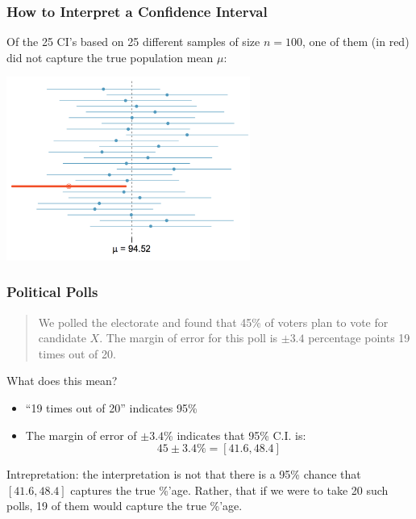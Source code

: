\documentclass[slides]{beamer}
\newcommand{\blue}[1]{\textcolor{blue2}{#1}}
\begin{document}
\begin{frame}
\frametitle{How to Interpret a Confidence Interval}
Of the 25 CI's based on 25 different samples of size $n=100$, one of them (in red) did not capture the true population mean $\mu$:

\begin{center}
\includegraphics[width=8cm]{figure/CI.png}
\end{center}

\end{frame}


\begin{frame}
\frametitle{Political Polls}
\begin{quotation}
\noindent We polled the electorate and found that 45\% of voters plan to vote for candidate $X$.  The margin of error for this poll is $\pm 3.4$ percentage points 19 times out of 20.  
\end{quotation}
\pause What does this mean?
\begin{itemize}
\item ``19 times out of 20'' indicates 95\%
\item The margin of error of $\pm 3.4$\% indicates that 95\% C.I. is:
\[45 \pm 3.4 \% = [41.6, 48.4]\]
\end{itemize}
\pause \blue{Intrepretation}: the interpretation is not that there is a 95\% chance that $[41.6, 48.4]$ captures the true \%'age.  Rather, that if we were to take 20 such polls, 19 of them would capture the true \%'age.
\end{frame}
\end{document}
